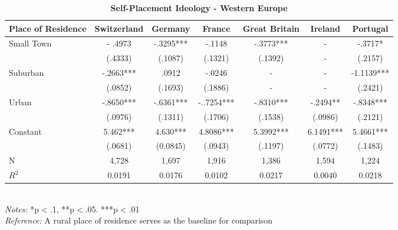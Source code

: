 \documentclass[12pt, titlepage]{article}
\newcommand\e{\emph}
\newcommand\tb{\textbf}
\begin{document}
\begin{landscape}
\begin{table}
	\centering
	\def\arraystretch{1.5}
	\caption{\tb{Self-Placement Ideology - Western Europe}}
	\begin{tabulary}{\linewidth}{l c c c c c c}
		\\
		\hline
		\tb{Place of Residence}&\tb{Switzerland}&\tb{Germany}&\tb{France} &\tb{Great Britain}&\tb{Ireland}&\tb{Portugal}\\
		\hline
		Small Town   & - .4973  & -.3295*** &-.1148 &  -.3773***  & -   &-.3717* \\      
		& (.4333)  & (.1087)  & (.1321)    & (.1392)  &- & (.2157) \\
		Suburban  & -.2663***   & .0912 & -.0246  & -      &-    & -1.1139*** \\ 
	    & (.0852)  & (.1693)  & (.1886)   & -      & - & (.2421)  \\
		Urban  & -.8650***  & -.6361*** & -..7254***  & -.8310***      &-.2494**& -.8348***   \\
	    & (.0976)  &(.1311)  & (.1706)    & (.1538)   & (.0986)  & (.2121)  \\
		Constant & 5.462***  & 4.630***  & 4.8086***  & 5.3992***  & 6.1491***  &5.4661***   \\
		&(.0681)&(0.0845)&(.0943)&(.1197)&(.0772)&(.1483) \\
		N  & 4,728    &1,697  & 1,916  & 1,386     &  1,594  &1,224  \\
		$R^2$  & 0.0191    &0.0176 &0.0102    &0.0217  &  0.0040 &0.0218  \\
		\hline                                       
	\end{tabulary} 
	\\
	\e{Notes:} *p$<$.1, **p$<$.05. ***p$<$.01 \\
	\e{Reference:} A rural place of residence serves as the baseline for comparison
	\label{table5}
\end{table}
\end{landscape}
\end{document}

